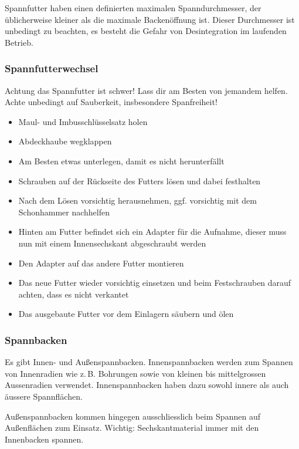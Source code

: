 \documentclass{\basedir/fablab-document}
\begin{document}
Spannfutter haben einen definierten maximalen Spanndurchmesser, der üblicherweise kleiner als die maximale Backenöffnung ist. Dieser Durchmesser ist unbedingt zu beachten, es besteht die Gefahr von Desintegration im laufenden Betrieb.

\subsubsection{Spannfutterwechsel}

Achtung das Spannfutter ist schwer! Lass dir am Besten von jemandem helfen. Achte unbedingt auf Sauberkeit, insbesondere Spanfreiheit!
\begin{itemize}
\item Maul- und Imbusschlüsselsatz holen
\item Abdeckhaube wegklappen
\item Am Besten etwas unterlegen, damit es nicht herunterfällt
\item Schrauben auf der Rückseite des Futters lösen und dabei festhalten 
\item Nach dem Lösen vorsichtig herausnehmen, ggf. vorsichtig mit dem Schonhammer nachhelfen
\item Hinten am Futter befindet sich ein Adapter für die Aufnahme, dieser muss nun mit einem Innensechskant abgeschraubt werden
\item Den Adapter auf das andere Futter montieren
\item Das neue Futter wieder vorsichtig einsetzen und beim Festschrauben darauf achten, dass es nicht verkantet
\item Das ausgebaute Futter vor dem Einlagern säubern und ölen
\end{itemize}

\subsubsection{Spannbacken}

Es gibt Innen- und Außenspannbacken.
Innenspannbacken werden zum Spannen von Innenradien wie z.\,B. Bohrungen sowie von kleinen bis mittelgrossen Aussenradien verwendet. Innenspannbacken haben dazu sowohl innere als auch äussere Spannflächen.

Außenspannbacken kommen hingegen ausschliesslich beim Spannen auf Außenflächen zum Einsatz.
Wichtig: Sechskantmaterial immer mit den Innenbacken spannen.
\end{document}
